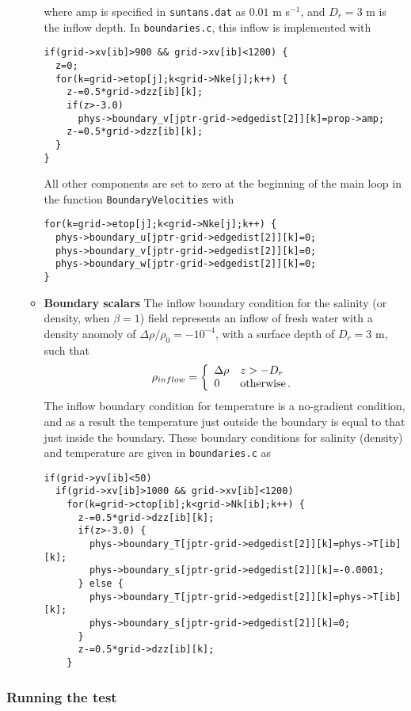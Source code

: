 \begin{itemize}
\begin{itemize}
where amp is specified in \verb+suntans.dat+ as $0.01$ m s$^{-1}$, and
$D_r=3$ m is the inflow depth.  In \verb+boundaries.c+, this inflow is implemented with
\begin{verbatim}
if(grid->xv[ib]>900 && grid->xv[ib]<1200) {
  z=0;
  for(k=grid->etop[j];k<grid->Nke[j];k++) {
    z-=0.5*grid->dzz[ib][k];
    if(z>-3.0)
      phys->boundary_v[jptr-grid->edgedist[2]][k]=prop->amp;
    z-=0.5*grid->dzz[ib][k];
  }
}
\end{verbatim}
All other components are set to zero at the beginning of the main loop in the function \verb+BoundaryVelocities+
with
\begin{verbatim}
for(k=grid->etop[j];k<grid->Nke[j];k++) {
  phys->boundary_u[jptr-grid->edgedist[2]][k]=0;
  phys->boundary_v[jptr-grid->edgedist[2]][k]=0;
  phys->boundary_w[jptr-grid->edgedist[2]][k]=0;
}
\end{verbatim}
\item[] {\bf Boundary scalars}
The inflow boundary condition for the salinity (or density, when $\beta=1$) field
represents an inflow of fresh water with a density anomoly of $\Delta \rho/\rho_0=-10^{-4}$, with a surface depth of $D_r=3$ m,
such that
\[
\rho_{inflow} = \left\{\begin{array}{ll}
                    \Delta \rho & z>-D_r \\
		    0 & \mbox{otherwise\,.}
		    \end{array}
             \right.
\]
The inflow boundary condition for temperature is a no-gradient condition, and as a result the temperature
just outside the boundary is equal to that just inside the boundary.  These boundary conditions for salinity (density)
and temperature are given in \verb+boundaries.c+ as
\begin{verbatim}
if(grid->yv[ib]<50)
  if(grid->xv[ib]>1000 && grid->xv[ib]<1200)
    for(k=grid->ctop[ib];k<grid->Nk[ib];k++) {
      z-=0.5*grid->dzz[ib][k];
      if(z>-3.0) {
        phys->boundary_T[jptr-grid->edgedist[2]][k]=phys->T[ib][k];
        phys->boundary_s[jptr-grid->edgedist[2]][k]=-0.0001;
      } else {
        phys->boundary_T[jptr-grid->edgedist[2]][k]=phys->T[ib][k];
        phys->boundary_s[jptr-grid->edgedist[2]][k]=0;
      }
      z-=0.5*grid->dzz[ib][k];
    }
\end{verbatim}
\end{itemize}
\end{itemize}

\subsubsection{Running the test}

